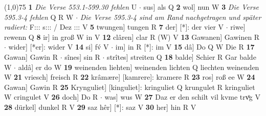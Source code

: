 \documentclass[8pt,a4paper,notitlepage]{article}
\begin{document}
\begin{table}[ht]
\begin{minipage}[t]{0.5\linewidth}
\line(1,0){75} \newline
\textbf{1} \textit{Die Verse 553.1-599.30 fehlen} U   $\cdot$ sus] als Q \textbf{2} wol] nun W \textbf{3} \textit{Die Verse 595.3-4 fehlen} Q R W   $\cdot$ \textit{Die Verse 595.3-4 sind am Rand nachgetragen und später radiert:} F::: s::: / Dez ::: V  \textbf{5} twungen] tungen R \textbf{7} der] [*]: der vier V  $\cdot$ riwe] rewenn Q \textbf{8} ir] in groß W in V \textbf{12} clâren] clar R (W) V \textbf{13} Gawanen] Gawinen R  $\cdot$ wider] [*er]: wider V \textbf{14} si] fv́ V  $\cdot$ im] in R [*]: im V \textbf{15} dâ] Do Q W Die R \textbf{17} Gawan] Gawin R  $\cdot$ sînes] sin R  $\cdot$ strîtes] streiten Q \textbf{18} balde] Schier R Gar balde W  $\cdot$ aldâ] er do W \textbf{19} weinenden liehten] weinenden lichten Q liechten weinenden W \textbf{21} vriesch] freisch R \textbf{22} krâmære] [kamrere]: kramere R \textbf{23} ros] roß ee W \textbf{24} Gawan] Gawin R \textbf{25} Krynguliet] [kinguliet]: kringuliet Q krungulet R kringuliet W cringulet V \textbf{26} doch] Do R  $\cdot$ was] wus W \textbf{27} Daz er den schilt vil kvme trvͦg V \textbf{28} dürkel] dunkel R V \textbf{29} saz hêr] [*]: saz V \textbf{30} her] hin R V \newline
\end{minipage}
\end{table}
\end{document}
